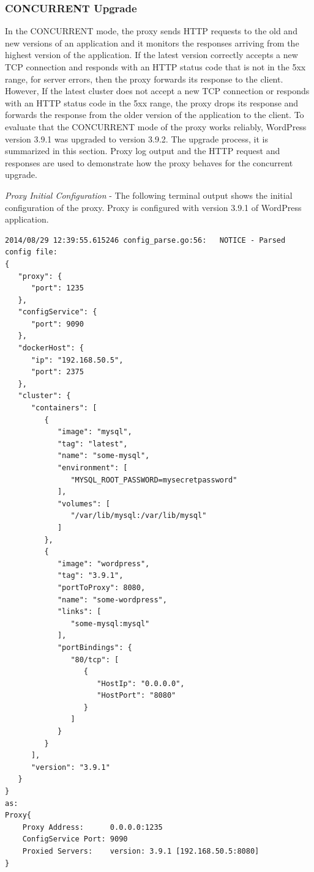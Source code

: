 \documentclass[a4paper,11pt,twoside]{report}
\begin{document}
\subsubsection*{CONCURRENT Upgrade}
In the CONCURRENT mode, the proxy sends HTTP requests to the old and new versions of an application and it monitors the responses arriving from the highest version of the application. If the latest version correctly accepts a new TCP connection and responds with an HTTP status code that is not in the 5xx range, for server errors, then the proxy forwards its response to the client. However, If the latest cluster does not accept a new TCP connection or responds with an HTTP status code in the 5xx range, the proxy drops its response and forwards the response from the older version of the application to the client. To evaluate that the CONCURRENT mode of the proxy works reliably, WordPress version 3.9.1 was upgraded to version 3.9.2. The upgrade process, it is summarized in this section. Proxy log output and the HTTP request and responses are used to demonstrate how the proxy behaves for the concurrent upgrade.

\noindent
\textit{Proxy Initial Configuration} - The following terminal output shows the initial configuration of the proxy. Proxy is configured with version 3.9.1 of WordPress application.\smallskip

\begin{lstlisting}[language=terminal]
2014/08/29 12:39:55.615246 config_parse.go:56:   NOTICE - Parsed config file:
{
   "proxy": {
      "port": 1235
   },
   "configService": {
      "port": 9090
   },
   "dockerHost": {
      "ip": "192.168.50.5",
      "port": 2375
   },
   "cluster": {
      "containers": [
         {
            "image": "mysql",
            "tag": "latest",
            "name": "some-mysql",
            "environment": [
               "MYSQL_ROOT_PASSWORD=mysecretpassword"
            ],
            "volumes": [
               "/var/lib/mysql:/var/lib/mysql"
            ]
         },
         {
            "image": "wordpress",
            "tag": "3.9.1",
            "portToProxy": 8080,
            "name": "some-wordpress",
            "links": [
               "some-mysql:mysql"
            ],
            "portBindings": {
               "80/tcp": [
                  {
                     "HostIp": "0.0.0.0",
                     "HostPort": "8080"
                  }
               ]
            }
         }
      ],
      "version": "3.9.1"
   }
}
as:
Proxy{
    Proxy Address:      0.0.0.0:1235
    ConfigService Port: 9090
    Proxied Servers:    version: 3.9.1 [192.168.50.5:8080]
}
\end{lstlisting}  
\end{document}
